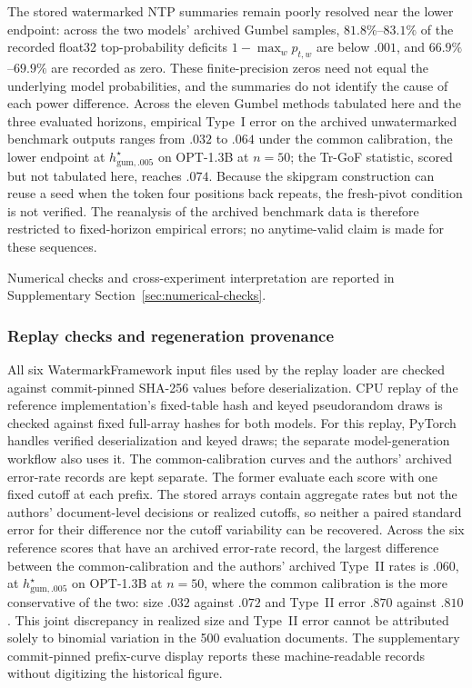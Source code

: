\documentclass[11pt]{article}
\begin{document}
The stored watermarked NTP summaries remain poorly resolved near the lower endpoint: across the two models' archived Gumbel samples, $81.8\%$--$83.1\%$ of the recorded float32 top-probability deficits $1-\max_w p_{t,w}$ are below $.001$, and $66.9\%$--$69.9\%$ are recorded as zero.  These finite-precision zeros need not equal the underlying model probabilities, and the summaries do not identify the cause of each power difference.  Across the eleven Gumbel methods tabulated here and the three evaluated horizons, empirical Type~I error on the archived unwatermarked benchmark outputs ranges from $.032$ to $.064$ under the common calibration, the lower endpoint at $h^\star_{\mathrm{gum},.005}$ on OPT-1.3B at $n=50$; the Tr-GoF statistic, scored but not tabulated here, reaches $.074$.  Because the skipgram construction can reuse a seed when the token four positions back repeats, the fresh-pivot condition is not verified.  The reanalysis of the archived benchmark data is therefore restricted to fixed-horizon empirical errors; no anytime-valid claim is made for these sequences.

\FloatBarrier
Numerical checks and cross-experiment interpretation are reported in Supplementary Section~\ref{sec:numerical-checks}.

\subsubsection{Replay checks and regeneration provenance}
\label{sec:released-replay}

All six WatermarkFramework input files used by the replay loader are checked against commit-pinned SHA-256 values before deserialization.  CPU replay of the reference implementation's fixed-table hash and keyed pseudorandom draws is checked against fixed full-array hashes for both models.  For this replay, PyTorch handles verified deserialization and keyed draws; the separate model-generation workflow also uses it.  The common-calibration curves and the authors' archived error-rate records are kept separate.  The former evaluate each score with one fixed cutoff at each prefix.  The stored arrays contain aggregate rates but not the authors' document-level decisions or realized cutoffs, so neither a paired standard error for their difference nor the cutoff variability can be recovered.  Across the six reference scores that have an archived error-rate record, the largest difference between the common-calibration and the authors' archived Type~II rates is $.060$, at $h^\star_{\mathrm{gum},.005}$ on OPT-1.3B at $n=50$, where the common calibration is the more conservative of the two: size $.032$ against $.072$ and Type~II error $.870$ against $.810$.  This joint discrepancy in realized size and Type~II error cannot be attributed solely to binomial variation in the 500 evaluation documents.  The supplementary commit-pinned prefix-curve display reports these machine-readable records without digitizing the historical figure.
\end{document}
